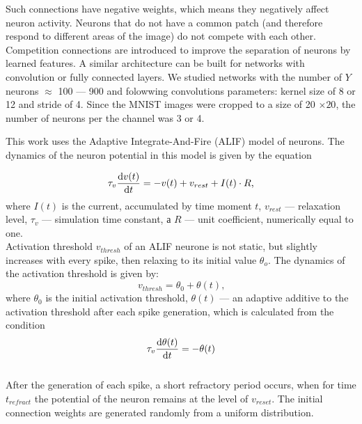 \documentclass[a4paper]{article}
\begin{document}
Such connections have negative weights, which means they negatively affect neuron activity. Neurons that do not have a common patch (and therefore respond to different areas of the image) do not compete with each other. Competition connections are introduced to improve the separation of neurons by learned features. A similar architecture can be built for networks with convolution or fully connected layers. We studied networks with the number of $Y$ neurons $\approx$ 100 --- 900 and folowwing convolutions parameters: kernel size of 8 or 12 and stride of 4. Since the MNIST images were cropped to a size of 20 $\times 20$, the number of neurons per the channel was 3 or 4.

This work uses the Adaptive Integrate-And-Fire (ALIF) model of neurons. The dynamics of the neuron potential in this model is given by the equation

\begin{equation} \label{eq:alif}
 \tau_v \dv{v(t)}{t} = -v(t) + v_{rest} + I(t) \cdot R \text{,}
\end{equation} where $I(t)$ is the current, accumulated by time moment $t$, $v_{rest}$ --- relaxation level, $\tau_v$ --- simulation time constant, а $R$ --- unit coefficient, numerically equal to one.\\ 

Activation threshold $v_{thresh}$ of an ALIF neurone is not static, but slightly increases with every spike, then relaxing to its initial value $\theta_o$. The dynamics of the activation threshold is given by:
\begin{equation} 
 v_{thresh} = \theta_0 + \theta(t) \text{,}
\end{equation} where $\theta_0$ is the initial activation threshold, $\theta(t)$ --- an adaptive additive to the activation threshold after each spike generation, which is calculated from the condition\\

\begin{equation}
 \tau_v \dv{\theta(t)}{t} = -\theta(t)
\end{equation}\\

After the generation of each spike, a short refractory period occurs, when for time $t_{refract}$ the potential of the neuron remains at the level of $v_{reset}$. The initial connection weights are generated randomly from a uniform distribution.
\end{document}
